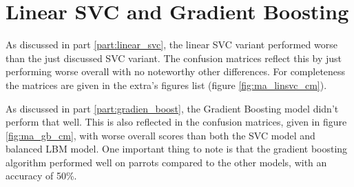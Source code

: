 
\section{Linear SVC and Gradient Boosting}
\label{section:ma_linSVC_grad_boost}

As discussed in part \ref{part:linear_svc}, the linear SVC variant performed worse than the just discussed SVC variant.
The confusion matrices reflect this by just performing worse overall with no noteworthy other differences.
For completeness the matrices are given in the extra's figures list (figure \ref{fig:ma_linsvc_cm}).

As discussed in part \ref{part:gradien_boost}, the Gradient Boosting model didn't perform that well.
This is also reflected in the confusion matrices, given in figure \ref{fig:ma_gb_cm}, with worse overall scores than both the SVC model and balanced LBM model.
One important thing to note is that the gradient boosting algorithm performed well on parrots compared to the other models, with an accuracy of 50\%.

